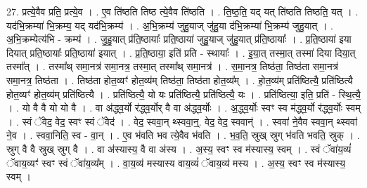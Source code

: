 \documentclass[17pt]{extarticle}
\begin{document}
27. प्रत्ये॒वैव प्रति॒ प्रत्ये॒व । . ए॒व ति॑ष्ठति तिष्ठ त्ये॒वैव ति॑ष्ठति । . ति॒ष्ठ॒ति॒ यद् यत् ति॑ष्ठति तिष्ठति॒ यत् । . यद॑भि॒क्रम्या॑ भि॒क्रम्य॒ यद् यद॑भि॒क्रम्य॑ । . अ॒भि॒क्रम्य॑ जुहु॒याज् जु॑हु॒या द॑भि॒क्रम्या॑ भि॒क्रम्य॑ जुहु॒यात् । . अ॒भि॒क्रम्येत्य॑भि - क्रम्य॑ । . जु॒हु॒यात् प्र॑ति॒ष्ठायाः᳚ प्रति॒ष्ठाया॑ जुहु॒याज् जु॑हु॒यात् प्र॑ति॒ष्ठायाः᳚ । . प्र॒ति॒ष्ठाया॑ इया दियात् प्रति॒ष्ठायाः᳚ प्रति॒ष्ठाया॑ इयात् । . प्र॒ति॒ष्ठाया॒ इति॑ प्रति - स्थायाः᳚ । . इ॒या॒त् तस्मा॒त् तस्मा॑ दिया दिया॒त् तस्मा᳚त् । . तस्मा᳚थ् समा॒नत्र॑ समा॒नत्र॒ तस्मा॒त् तस्मा᳚थ् समा॒नत्र॑ । . स॒मा॒नत्र॒ तिष्ठ॑ता॒ तिष्ठ॑ता समा॒नत्र॑ समा॒नत्र॒ तिष्ठ॑ता । . तिष्ठ॑ता होत॒व्यꣳ॑ होत॒व्य॑म् तिष्ठ॑ता॒ तिष्ठ॑ता होत॒व्य᳚म् । . हो॒त॒व्य॑म् प्रति॑ष्ठित्यै॒ प्रति॑ष्ठित्यै होत॒व्यꣳ॑ होत॒व्य॑म् प्रति॑ष्ठित्यै । . प्रति॑ष्ठित्यै॒ यो यः प्रति॑ष्ठित्यै॒ प्रति॑ष्ठित्यै॒ यः । . प्रति॑ष्ठित्या॒ इति॒ प्रति॑ - स्थि॒त्यै॒ । . यो वै वै यो यो वै । . वा अ॑द्ध्व॒र्यो र॑द्ध्व॒र्योर् वै वा अ॑द्ध्व॒र्योः । . अ॒द्ध्व॒र्योः स्वꣳ स्व म॑द्ध्व॒र्यो र॑द्ध्व॒र्योः स्वम् । . स्वं ॅवेद॒ वेद॒ स्वꣳ स्वं ॅवेद॑ । . वेद॒ स्ववा॒न् थ्स्ववा॒न्॒. वेद॒ वेद॒ स्ववान्॑ । . स्ववा॑ ने॒वैव स्ववा॒न् थ्स्ववा॑ ने॒व । . स्ववा॒निति॒ स्व - वा॒न् । . ए॒व भ॑वति भव त्ये॒वैव भ॑वति । . भ॒व॒ति॒ स्रुख् स्रुग् भ॑वति भवति॒ स्रुक् । . स्रुग् वै वै स्रुख् स्रुग् वै । . वा अ॑स्यास्य॒ वै वा अ॑स्य । . अ॒स्य॒ स्वꣳ स्व म॑स्यास्य॒ स्वम् । . स्वं ॅवा॑य॒व्यं॑ ॅवाय॒व्यꣳ॑ स्वꣳ स्वं ॅवा॑य॒व्य᳚म् । . वा॒य॒व्य॑ मस्यास्य वाय॒व्यं॑ ॅवाय॒व्य॑ मस्य । . अ॒स्य॒ स्वꣳ स्व म॑स्यास्य॒ स्वम् । \newline
\end{document}

